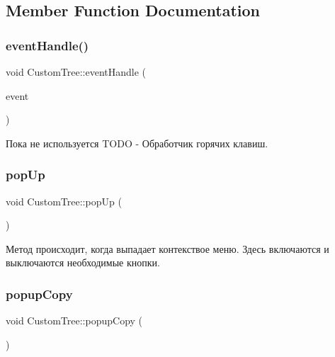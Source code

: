 \subsection{Member Function Documentation}
\mbox{\label{class_custom_tree_a3687c6feff0539eec56582ff95239589}} 
\subsubsection{\texorpdfstring{event\+Handle()}{eventHandle()}}
{\footnotesize\ttfamily void Custom\+Tree\+::event\+Handle (\begin{DoxyParamCaption}\item[{Q\+Key\+Event $\ast$}]{event }\end{DoxyParamCaption})}

Пока не используется T\+O\+DO -\/ Обработчик горячих клавиш. \mbox{\label{class_custom_tree_a183106efb54d0ce0d24da6bdb537002b}} 
\subsubsection{\texorpdfstring{pop\+Up}{popUp}}
{\footnotesize\ttfamily void Custom\+Tree\+::pop\+Up (\begin{DoxyParamCaption}{ }\end{DoxyParamCaption})\hspace{0.3cm}{\ttfamily [slot]}}

Метод происходит, когда выпадает контекствое меню. Здесь включаются и выключаются необходимые кнопки. \mbox{\label{class_custom_tree_a66a79068ff84c6e74290c9ba0709f770}} 
\subsubsection{\texorpdfstring{popup\+Copy}{popupCopy}}
{\footnotesize\ttfamily void Custom\+Tree\+::popup\+Copy (\begin{DoxyParamCaption}{ }\end{DoxyParamCaption})\hspace{0.3cm}{\ttfamily [slot]}}



